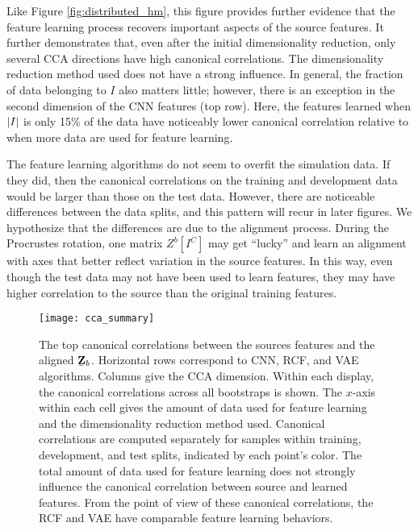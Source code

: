 Like Figure \ref{fig:distributed_hm}, this figure provides further evidence that
the feature learning process recovers important aspects of the source features.
It further demonstrates that, even after the initial dimensionality reduction,
only several CCA directions have high canonical correlations. The dimensionality
reduction method used does not have a strong influence. In general, the fraction
of data belonging to $I$ also matters little; however, there is an exception in
the second dimension of the CNN features (top row). Here, the features learned
when $\left|I\right|$ is only 15\% of the data have noticeably lower canonical
correlation relative to when more data are used for feature learning.

The feature learning algorithms do not seem to overfit the simulation data. If
they did, then the canonical correlations on the training and development data
would be larger than those on the test data. However, there are noticeable
differences between the data splits, and this pattern will recur in later
figures. We hypothesize that the differences are due to the alignment process.
During the Procrustes rotation, one matrix $Z^{b}\left[I^{C}\right]$ may get
``lucky'' and learn an alignment with axes that better reflect variation in the
source features. In this way, even though the test data may not have been used
to learn features, they may have higher correlation to the source than the
original training features.

\begin{figure}
  \centering
  \texttt{[image: cca\_summary]}
  \caption{The top canonical correlations between the sources features and the
    aligned $\protect\underaccent{\bar}{\mathbf{Z}}_{b}$. Horizontal rows correspond to
    CNN, RCF, and VAE algorithms. Columns give the CCA dimension. Within each
    display, the canonical correlations across all bootstraps is shown. The
    $x$-axis within each cell gives the amount of data used for feature learning
    and the dimensionality reduction method used. Canonical correlations are
    computed separately for samples within training, development, and test
    splits, indicated by each point's color. The total amount of data used for
    feature learning does not strongly influence the canonical correlation
    between source and learned features. From the point of view of these
    canonical correlations, the RCF and VAE have comparable feature learning
    behaviors.}
  \label{fig:cca_summary}
\end{figure}

